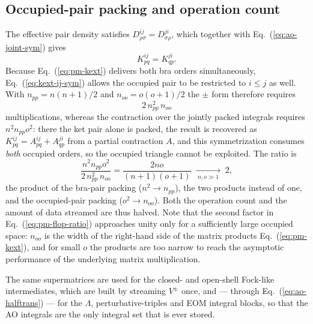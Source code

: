 \documentclass[a4paper,12pt,oneside]{book}
\newcommand{\eq}[1]{Eq.~(\ref{#1})}
\begin{document}
\subsection{Occupied-pair packing and operation count}
The effective pair density satisfies $D^{ij}_{\rho\sigma} = D^{ji}_{\sigma\rho}$, which together
with \eq{eq:ao-joint-sym} gives
\begin{equation}
\label{eq:kext-ij-sym}
K^{ij}_{pq} = K^{ji}_{qp}.
\end{equation}
Because \eq{eq:pm-kext} delivers both bra orders simultaneously, \eq{eq:kext-ij-sym} allows the
occupied pair to be restricted to $i \le j$ as well. With $n_{pp} = n(n+1)/2$ and
$n_{oo} = o(o+1)/2$ the $\pm$ form therefore requires
\begin{equation}
2\, n_{pp}^2\, n_{oo}
\end{equation}
multiplications, whereas the contraction over the jointly packed integrals requires
$n^2 n_{pp} o^2$: there the ket pair alone is packed, the result is recovered as
$K^{ij}_{pq} = A^{ij}_{pq} + A^{ji}_{qp}$ from a partial contraction $A$, and this symmetrization
consumes \emph{both} occupied orders, so the occupied triangle cannot be exploited. The ratio is
\begin{equation}
\label{eq:pm-flop-ratio}
\frac{n^2 n_{pp} o^2}{2\,n_{pp}^2\,n_{oo}} = \frac{2no}{(n+1)(o+1)}
\;\xrightarrow[\;n,o\gg 1\;]{}\; 2,
\end{equation}
the product of the bra-pair packing ($n^2 \to n_{pp}$), the two products instead of one, and the
occupied-pair packing ($o^2 \to n_{oo}$). Both the operation count and the amount of data streamed
are thus halved. Note that the second factor in \eq{eq:pm-flop-ratio} approaches unity only for a
sufficiently large occupied space: $n_{oo}$ is the width of the right-hand side of the matrix
products \eq{eq:pm-kext}, and for small $o$ the products are too narrow to reach the asymptotic
performance of the underlying matrix multiplication.

The same supermatrices are used for the closed- and open-shell Fock-like intermediates, which are
built by streaming $V^{\pm}$ once, and — through \eq{eq:ao-halftrans} — for the $\Lambda$,
perturbative-triples and EOM integral blocks, so that the AO integrals are the only integral set
that is ever stored.
\end{document}
